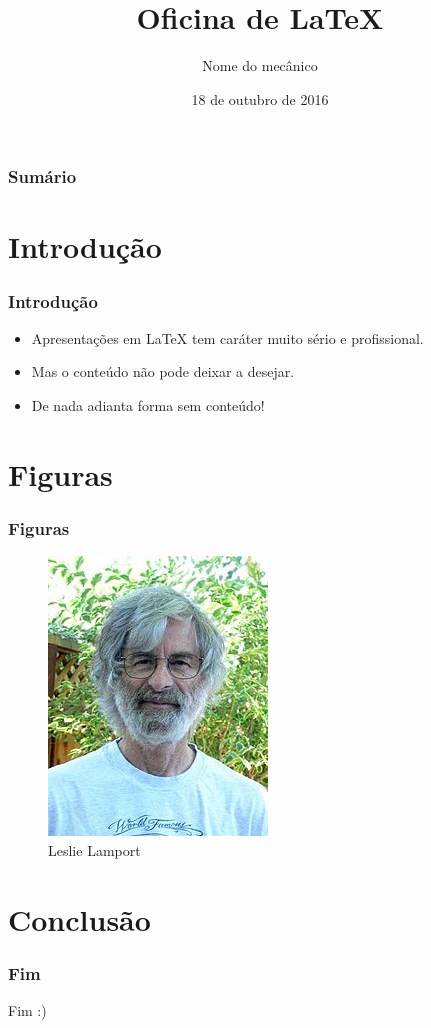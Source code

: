 \documentclass{beamer}
\title{Oficina de \LaTeX}
\author{Nome do mecânico} %
\date{18 de outubro de 2016} %
\institute{IFG}
\begin{document}
\maketitle


\begin{frame}
	\frametitle{Sumário}
	\tableofcontents
\end{frame}
\section{Introdução}

\begin{frame}
\frametitle{Introdução}
\begin{itemize}
\item Apresentações em \LaTeX{} tem caráter muito sério e profissional.
\item Mas o conteúdo não pode deixar a desejar.
\item De nada adianta forma sem conteúdo!
\end{itemize}
\end{frame}

\section{Figuras}
\begin{frame}
\frametitle{Figuras}
\begin{figure}[H]
\centering
\includegraphics[scale=.7]{figuras/Lamport}
\caption{Leslie Lamport}
\end{figure}
\end{frame}

\section{Conclusão}
\begin{frame}
\frametitle{Fim}
\begin{center}
\Huge{Fim :)}
\end{center}
\end{frame}
\end{document}
